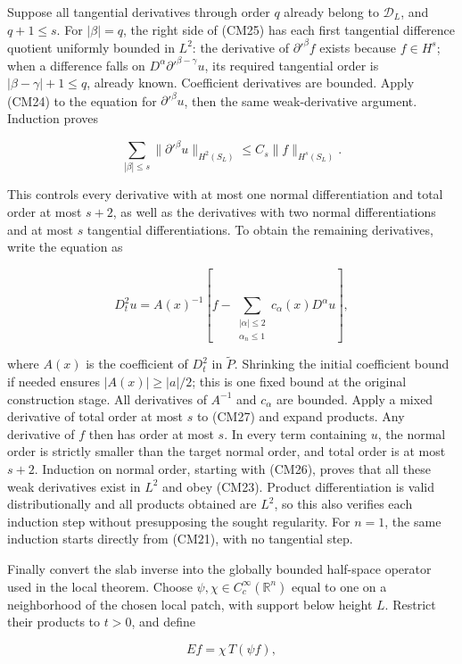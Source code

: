 \documentclass[
  11pt,
]{article}
\begin{document}
Suppose all tangential derivatives through order \(q\) already belong to
\(\mathcal D_L\), and \(q+1\leq s\). For \(|\beta|=q\), the right side
of (CM25) has each first tangential difference quotient uniformly
bounded in \(L^2\): the derivative of \(\partial'^\beta f\) exists
because \(f\in H^s\); when a difference falls on
\(D^\alpha\partial'^{\beta-\gamma}u\), its required tangential order is
\(|\beta-\gamma|+1\leq q\), already known. Coefficient derivatives are
bounded. Apply (CM24) to the equation for \(\partial'^\beta u\), then
the same weak-derivative argument. Induction proves

\[
\sum_{|\beta|\leq s}\|\partial'^\beta u\|_{H^2(S_L)}
\leq C_s\|f\|_{H^s(S_L)}.
\tag{CM26}
\]

This controls every derivative with at most one normal differentiation
and total order at most \(s+2\), as well as the derivatives with two
normal differentiations and at most \(s\) tangential differentiations.
To obtain the remaining derivatives, write the equation as

\[
D_t^2u=A(x)^{-1}
\left[f-\sum_{\substack{|\alpha|\leq2\\\alpha_n\leq1}}
c_\alpha(x)D^\alpha u\right],
\tag{CM27}
\]

where \(A(x)\) is the coefficient of \(D_t^2\) in \(\widetilde P\).
Shrinking the initial coefficient bound if needed ensures
\(|A(x)|\geq|a|/2\); this is one fixed bound at the original
construction stage. All derivatives of \(A^{-1}\) and \(c_\alpha\) are
bounded. Apply a mixed derivative of total order at most \(s\) to (CM27)
and expand products. Any derivative of \(f\) then has order at most
\(s\). In every term containing \(u\), the normal order is strictly
smaller than the target normal order, and total order is at most
\(s+2\). Induction on normal order, starting with (CM26), proves that
all these weak derivatives exist in \(L^2\) and obey (CM23). Product
differentiation is valid distributionally and all products obtained are
\(L^2\), so this also verifies each induction step without presupposing
the sought regularity. For \(n=1\), the same induction starts directly
from (CM21), with no tangential step.

Finally convert the slab inverse into the globally bounded half-space
operator used in the local theorem. Choose
\(\psi,\chi\in C_c^\infty(\mathbb R^n)\) equal to one on a neighborhood
of the chosen local patch, with support below height \(L\). Restrict
their products to \(t>0\), and define

\[
Ef=\chi\,T(\psi f),
\tag{CM28}
\]
\end{document}
